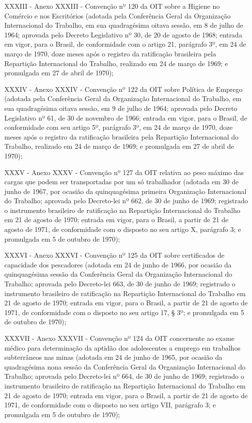 \documentclass[
]{book}
\begin{document}
XXXIII - Anexo XXXIII - Convenção nº 120 da OIT sobre a Higiene no Comércio e nos Escritórios (adotada pela Conferência Geral da Organização Internacional do Trabalho, em sua quadragésima oitava sessão, em 8 de julho de 1964; aprovada pelo Decreto Legislativo nº 30, de 20 de agosto de 1968; entrada em vigor, para o Brasil, de conformidade com o artigo 21, parágrafo 3º, em 24 de março de 1970, doze meses após o registro da ratificação brasileira pela Repartição Internacional do Trabalho, realizado em 24 de março de 1969; e promulgada em 27 de abril de 1970);

XXXIV - Anexo XXXIV - Convenção nº 122 da OIT sobre Política de Emprego (adotada pela Conferência Geral da Organização Internacional do Trabalho, em sua quadragésima oitava sessão, em 9 de julho de 1964; aprovada pelo Decreto Legislativo nº 61, de 30 de novembro de 1966; entrada em vigor, para o Brasil, de conformidade com seu artigo 5º, parágrafo 3º, em 24 de março de 1970, doze meses após o registro da ratificação brasileira pela Repartição Internacional do Trabalho, realizado em 24 de março de 1969; e promulgada em 27 de abril de 1970);

XXXV - Anexo XXXV - Convenção nº 127 da OIT relativa ao peso máximo das cargas que podem ser transportadas por um só trabalhador (adotada em 30 de junho de 1967, por ocasião da quinquagésima primeira Organização Internacional do Trabalho; aprovada pelo Decreto-lei nº 662, de 30 de junho de 1969; registrado o instrumento brasileiro de ratificação na Repartição Internacional do Trabalho em 21 de agosto de 1970; entrada em vigor, para o Brasil, a partir de 21 de agosto de 1971, de conformidade com o disposto no seu artigo X, parágrafo 3; e promulgada em 5 de outubro de 1970);

XXXVI - Anexo XXXVI - Convenção nº 125 da OIT sobre certificados de capacidade dos pescadores (adotada em 24 de junho de 1966, por ocasião da quinquagésima sessão da Conferência Geral da Organização Internacional do Trabalho; aprovada pelo Decreto-lei 663, de 30 de junho de 1969; registrado o instrumento brasileiro de ratificação na Repartição Internacional do Trabalho em 21 de agosto de 1970; entrada em vigor, para o Brasil, a partir de 21 de agosto de 1971, de conformidade com o disposto no seu artigo 17, § 3º; e promulgada em 5 de outubro de 1970);

XXXVII - Anexo XXXVII - Convenção nº 124 da OIT concernente ao exame médico para determinação da aptidão dos adolescentes a emprego em trabalhos subterrâneos nas minas (adotada em 24 de junho de 1965, por ocasião da quadragésima nona sessão da Conferência Geral da Organização Internacional do Trabalho; aprovada pelo Decreto-lei nº 664, de 30 de junho de 1969; registrado o instrumento brasileiro de ratificação na Repartição Internacional do Trabalho em 21 de agosto de 1970; entrada em vigor, para o Brasil, a partir de 21 de agosto de 1971, de conformidade com o disposto no seu artigo VII, parágrafo 3; e promulgada em 5 de outubro de 1970);
\end{document}
